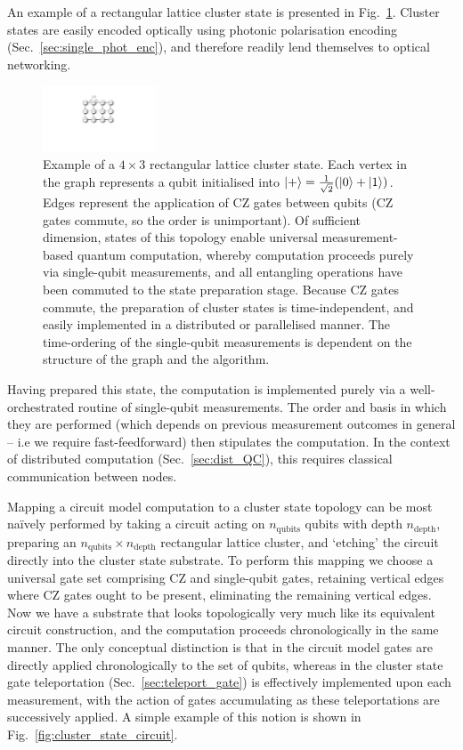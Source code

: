 An example of a rectangular lattice cluster state is presented in Fig.~\ref{fig:cluster_state}. Cluster states are easily encoded optically using photonic polarisation encoding (Sec.~\ref{sec:single_phot_enc}), and therefore readily lend themselves to optical networking.

\begin{figure}[!htbp]
	\includegraphics[clip=true, width=0.3\textwidth]{cluster_state}
	\captionspacefig \caption{Example of a \mbox{$4\times 3$} rectangular lattice cluster state. Each vertex in the graph represents a qubit initialised into \mbox{$|+\rangle=\frac{1}{\sqrt{2}}(|0\rangle+|1\rangle)$}. Edges represent the application of CZ gates between qubits (CZ gates commute, so the order is unimportant). Of sufficient dimension, states of this topology enable universal measurement-based quantum computation, whereby computation proceeds purely via single-qubit measurements, and all entangling operations have been commuted to the state preparation stage. Because CZ gates commute, the preparation of cluster states is time-independent, and easily implemented in a distributed or parallelised manner. The time-ordering of the single-qubit measurements is dependent on the structure of the graph and the algorithm.} \label{fig:cluster_state}
\end{figure}

Having prepared this state, the computation is implemented purely via a well-orchestrated routine of single-qubit measurements. The order and basis in which they are performed (which depends on previous measurement outcomes in general -- i.e we require fast-feedforward) then stipulates the computation. In the context of distributed computation (Sec.~\ref{sec:dist_QC}), this requires classical communication between nodes.

Mapping a circuit model computation to a cluster state topology can be most na{\" i}vely performed by taking a circuit acting on $n_\mathrm{qubits}$ qubits with depth $n_\mathrm{depth}$, preparing an \mbox{$n_\mathrm{qubits}\times n_\mathrm{depth}$} rectangular lattice cluster, and `etching' the circuit directly into the cluster state substrate. To perform this mapping we choose a universal gate set comprising CZ and single-qubit gates, retaining vertical edges where CZ gates ought to be present, eliminating the remaining vertical edges. Now we have a substrate that looks topologically very much like its equivalent circuit construction, and the computation proceeds chronologically in the same manner. The only conceptual distinction is that in the circuit model gates are directly applied chronologically to the set of qubits, whereas in the cluster state gate teleportation (Sec.~\ref{sec:teleport_gate}) is effectively implemented upon each measurement, with the action of gates accumulating as these teleportations are successively applied. A simple example of this notion is shown in Fig.~\ref{fig:cluster_state_circuit}.

